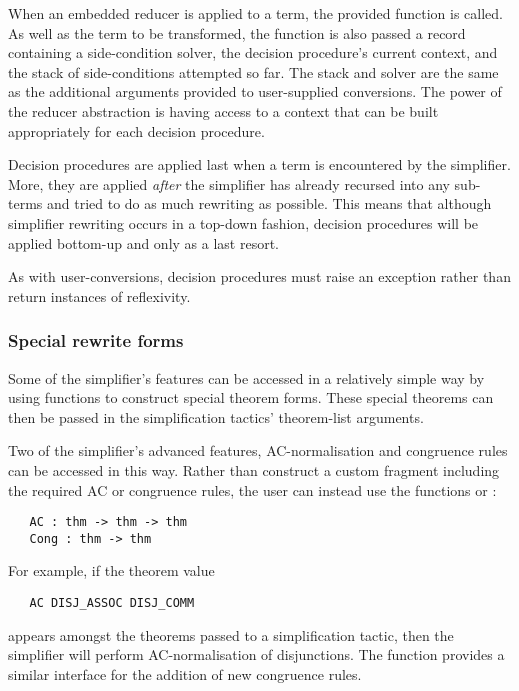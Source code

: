 {When an embedded reducer is applied to a term, the provided 
function is called.  As well as the term to be transformed, the
 function is also passed a record containing a
side-condition solver, the decision procedure's current context, and
the stack of side-conditions attempted so far.  The stack and solver
are the same as the additional arguments provided to user-supplied
conversions.  The power of the reducer abstraction is having access to
a context that can be built appropriately for each decision procedure.

Decision procedures are applied last when a term is encountered by the
simplifier.  More, they are applied \emph{after} the simplifier has
already recursed into any sub-terms and tried to do as much rewriting
as possible.  This means that although simplifier rewriting occurs in
a top-down fashion, decision procedures will be applied bottom-up and
only as a last resort.

As with user-conversions, decision procedures must raise an exception
rather than return instances of reflexivity.

\subsubsection{Special rewrite forms}
\label{sec:simp-special-rewrite-forms}

Some of the simplifier's features can be accessed in a relatively
simple way by using \ML{} functions to construct special theorem
forms.  These special theorems can then be passed in the
simplification tactics' theorem-list arguments.

Two of the simplifier's advanced features, AC-normalisation and
congruence rules can be accessed in this way.  Rather than construct a
custom \simpset{} fragment including the required AC or congruence
rules, the user can instead use the functions  or :
\begin{hol}
\begin{verbatim}
   AC : thm -> thm -> thm
   Cong : thm -> thm
\end{verbatim}
\end{hol}
For example, if the theorem value
\begin{hol}
\begin{verbatim}
   AC DISJ_ASSOC DISJ_COMM
\end{verbatim}
\end{hol}
appears amongst the theorems passed to a simplification tactic, then
the simplifier will perform AC-normalisation of disjunctions.  The
 function provides a similar interface for the addition of
new congruence rules.

}
